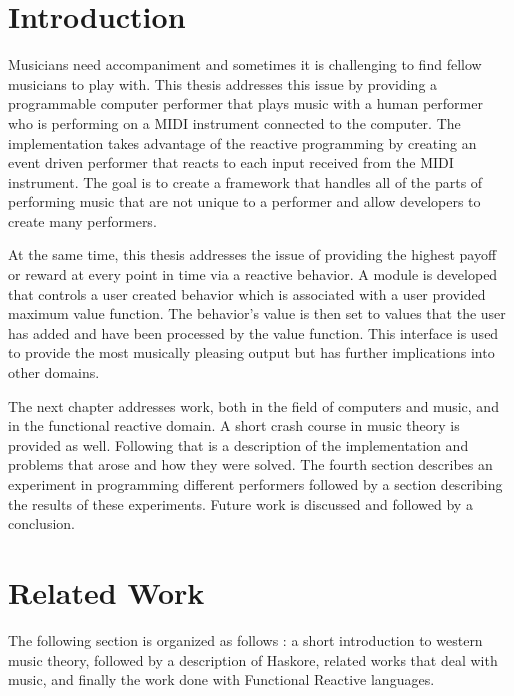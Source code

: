 \documentclass[12pt]{ucthesis}
\begin{document}




\chapter{Introduction}
\label{intro}

Musicians need accompaniment and sometimes it is challenging to find fellow musicians to play with. This thesis addresses this issue by providing a programmable computer performer that plays music with a human performer who is performing on a MIDI instrument connected to the computer. The implementation takes advantage of the reactive programming by creating an event driven performer that reacts to each input received from the MIDI instrument. The goal is to create a framework that handles all of the parts of performing music that are not unique to a performer and allow developers to create many performers. 

At the same time, this thesis addresses the issue of providing the highest payoff or reward at every point in time via a reactive behavior. A module is developed that controls a user created behavior which is associated with a user provided maximum value function. The behavior's value is then set to values that the user has added and have been processed by the value function. This interface is used to provide the most musically pleasing output but has further implications into other domains. 

The next chapter addresses work, both in the field of computers and music, and in the functional reactive domain. A short crash course in music theory is provided as well. Following that is a description of the implementation and problems that arose and how they were solved. The fourth section describes an experiment in programming different performers followed by a section describing the results of these experiments. Future work is discussed and followed by a conclusion.

\chapter{Related Work}
\label{rw}

The following section is organized as follows : a short introduction to western music theory, followed by a description of Haskore, related works that deal with music, and finally the work done with Functional Reactive languages.
\end{document}
